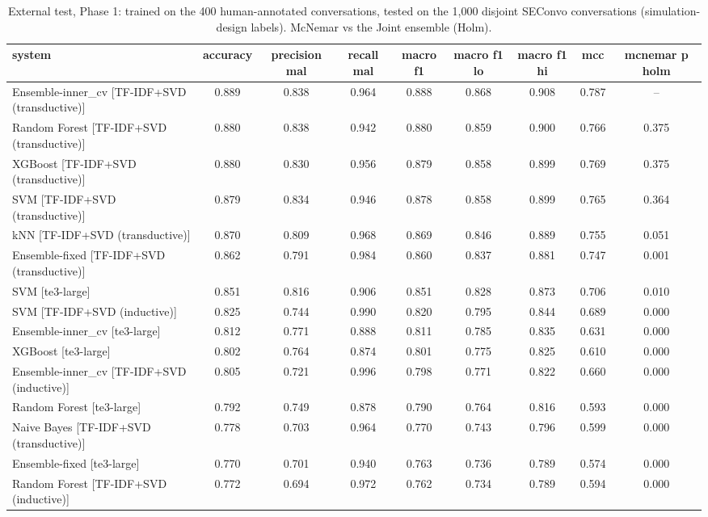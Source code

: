 \begin{table}[htbp]
\centering
\caption{External test, Phase 1: trained on the 400 human-annotated conversations, tested on the 1,000 disjoint SEConvo conversations (simulation-design labels). McNemar vs the Joint ensemble (Holm).}
\label{tab:table8_external_phase1}
\small
\begin{tabular}{lcccccccc}
\toprule
\textbf{system} & \textbf{accuracy} & \textbf{precision mal} & \textbf{recall mal} & \textbf{macro f1} & \textbf{macro f1 lo} & \textbf{macro f1 hi} & \textbf{mcc} & \textbf{mcnemar p holm} \\
\midrule
Ensemble-inner\_cv [TF-IDF+SVD (transductive)] & 0.889 & 0.838 & 0.964 & 0.888 & 0.868 & 0.908 & 0.787 & -- \\
Random Forest [TF-IDF+SVD (transductive)] & 0.880 & 0.838 & 0.942 & 0.880 & 0.859 & 0.900 & 0.766 & 0.375 \\
XGBoost [TF-IDF+SVD (transductive)] & 0.880 & 0.830 & 0.956 & 0.879 & 0.858 & 0.899 & 0.769 & 0.375 \\
SVM [TF-IDF+SVD (transductive)] & 0.879 & 0.834 & 0.946 & 0.878 & 0.858 & 0.899 & 0.765 & 0.364 \\
kNN [TF-IDF+SVD (transductive)] & 0.870 & 0.809 & 0.968 & 0.869 & 0.846 & 0.889 & 0.755 & 0.051 \\
Ensemble-fixed [TF-IDF+SVD (transductive)] & 0.862 & 0.791 & 0.984 & 0.860 & 0.837 & 0.881 & 0.747 & 0.001 \\
SVM [te3-large] & 0.851 & 0.816 & 0.906 & 0.851 & 0.828 & 0.873 & 0.706 & 0.010 \\
SVM [TF-IDF+SVD (inductive)] & 0.825 & 0.744 & 0.990 & 0.820 & 0.795 & 0.844 & 0.689 & 0.000 \\
Ensemble-inner\_cv [te3-large] & 0.812 & 0.771 & 0.888 & 0.811 & 0.785 & 0.835 & 0.631 & 0.000 \\
XGBoost [te3-large] & 0.802 & 0.764 & 0.874 & 0.801 & 0.775 & 0.825 & 0.610 & 0.000 \\
Ensemble-inner\_cv [TF-IDF+SVD (inductive)] & 0.805 & 0.721 & 0.996 & 0.798 & 0.771 & 0.822 & 0.660 & 0.000 \\
Random Forest [te3-large] & 0.792 & 0.749 & 0.878 & 0.790 & 0.764 & 0.816 & 0.593 & 0.000 \\
Naive Bayes [TF-IDF+SVD (transductive)] & 0.778 & 0.703 & 0.964 & 0.770 & 0.743 & 0.796 & 0.599 & 0.000 \\
Ensemble-fixed [te3-large] & 0.770 & 0.701 & 0.940 & 0.763 & 0.736 & 0.789 & 0.574 & 0.000 \\
Random Forest [TF-IDF+SVD (inductive)] & 0.772 & 0.694 & 0.972 & 0.762 & 0.734 & 0.789 & 0.594 & 0.000 \\

\end{tabular}
\end{table}
